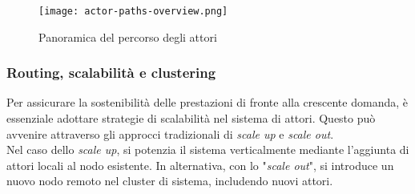 \begin{figure}[H]
  \centering
  \texttt{[image: actor-paths-overview.png]}
  \caption[Percorso degli attori]{Panoramica del percorso degli attori}
\end{figure}

\subsubsection[Routing, scalabilità e clustering]{Routing, scalabilità e clustering}
Per assicurare la sostenibilità delle prestazioni di fronte alla crescente domanda, è essenziale adottare strategie di scalabilità nel sistema di attori.
Questo può avvenire attraverso gli approcci tradizionali di \textit{scale up} e \textit{scale out}. \\
Nel caso dello \textit{scale up}, si potenzia il sistema verticalmente mediante l'aggiunta di attori locali al nodo esistente.
In alternativa, con lo "\textit{scale out}", si introduce un nuovo nodo remoto nel cluster di sistema, includendo nuovi attori.

